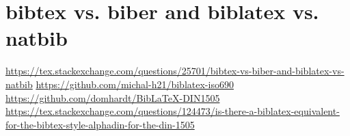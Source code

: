 \chapter{bibtex vs. biber and biblatex vs. natbib}
\label{bib}
\url{https://tex.stackexchange.com/questions/25701/bibtex-vs-biber-and-biblatex-vs-natbib}
\url{https://github.com/michal-h21/biblatex-iso690}
\url{https://github.com/domhardt/BibLaTeX-DIN1505}
\url{https://tex.stackexchange.com/questions/124473/is-there-a-biblatex-equivalent-for-the-bibtex-style-alphadin-for-the-din-1505}